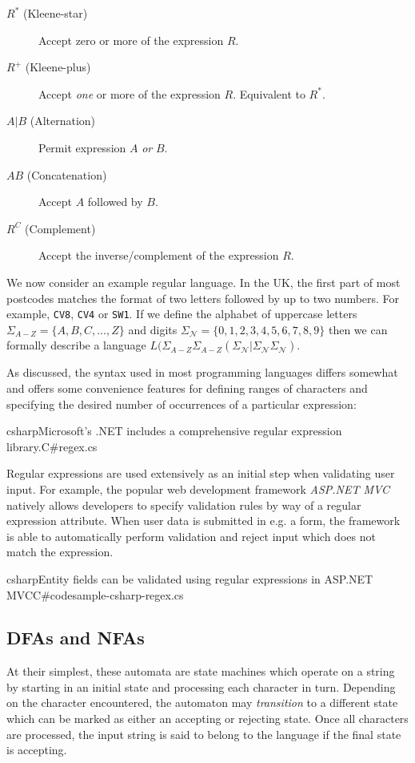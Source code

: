 \documentclass[a4paper,openany,12pt]{book}
\begin{document}
\begin{description}
    \item[$R^*$ (Kleene-star)] Accept zero or more of the expression $R$.
    \item[$R^+$ (Kleene-plus)] Accept \emph{one} or more of the expression $R$. Equivalent to ${R^*}$.
    \item[$A \vert{} B$ (Alternation)] Permit expression $A$ \emph{or} $B$.
    \item[$AB$ (Concatenation)] Accept $A$ followed by $B$.
    \item[$R^C$ (Complement)] Accept the inverse/complement of the expression $R$.
\end{description}


We now consider an example regular language. In the UK, the first part of most postcodes matches the format of two
letters followed by up to two numbers. For example, \texttt{CV8}, \texttt{CV4} or \texttt{SW1}.
If we define the alphabet of uppercase letters $\Sigma_{A-Z} = \{A, B, C, \ldots, Z\}$ and digits $\Sigma_\mathcal{N} =
\{0,1,2,3,4,5,6,7,8,9\}$ then we can formally describe a language $L(\Sigma_{A-Z} \Sigma_{A-Z}(\Sigma_\mathcal{N} |
\Sigma_\mathcal{N} \Sigma_\mathcal{N})$.

As discussed, the syntax used in most programming languages differs somewhat and offers some convenience features for
defining ranges of characters and specifying the desired number of occurrences of a particular expression:\\

\begin{mycodefile}{csharp}{Microsoft's .NET includes a comprehensive regular expression library.}{C\#}{regex.cs}
\end{mycodefile}

Regular expressions are used extensively as an initial step when validating user input.
For example, the popular web development framework \emph{ASP.NET MVC} natively allows developers to specify validation
rules by way of a regular expression attribute.
When user data is submitted in e.g. a form, the framework is able to automatically perform validation and reject input
which does not match the expression.

\begin{mycodefile}{csharp}{Entity fields can be validated using regular expressions in ASP.NET MVC}{C\#}{codesample-csharp-regex.cs}
\end{mycodefile}

\subsection{DFAs and NFAs}
At their simplest, these automata are state machines which operate on a string by starting in an initial state and
processing each character in turn.
Depending on the character encountered, the automaton may \emph{transition} to a different state which can be marked as
either an accepting or rejecting state.
Once all characters are processed, the input string is said to belong to the language if the final state is accepting.
\end{document}
